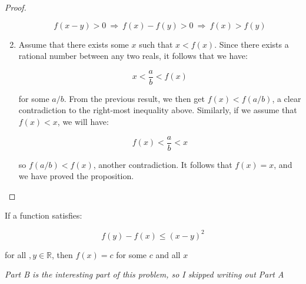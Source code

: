 \documentclass[10pt, oneside]{article}
\newenvironment{problem}[2][Problem]{\begin{trivlist}
\item[\hskip \labelsep {\bfseries #1}\hskip \labelsep {\bfseries #2.}]}{\end{trivlist}}
\begin{document}
\begin{proof}
\begin{enumerate}
        $$f(x - y) > 0 \ \Rightarrow \ f(x) - f(y) > 0 \ \Rightarrow \ f(x) > f(y)$$

      \item Assume that there exists some $x$ such that $x < f(x)$. Since there exists a rational number between any two reals, it follows that we have:

        $$x < \frac{a}{b} < f(x)$$

        for some $a/b$. From the previous result, we then get $f(x) < f(a/b)$, a clear contradiction to the right-most inequality above. Similarly, if we assume
        that $f(x) < x$, we will have:

        $$f(x) < \frac{a}{b} < x$$

        so $f(a/b) < f(x)$, another contradiction. It follows that $f(x) = x$, and we have proved the proposition.

        \end{enumerate}
    \end{proof}

    \begin{problem}{3.20B}
      If a function satisfies:

      $$f(y) - f(x) \leq (x - y)^2$$

      for all $, y \in \mathbb{R}$, then $f(x) = c$ for some $c$ and all $x$
    \end{problem}

    \textit{Part B is the interesting part of this problem, so I skipped writing out Part A}
\end{document}
